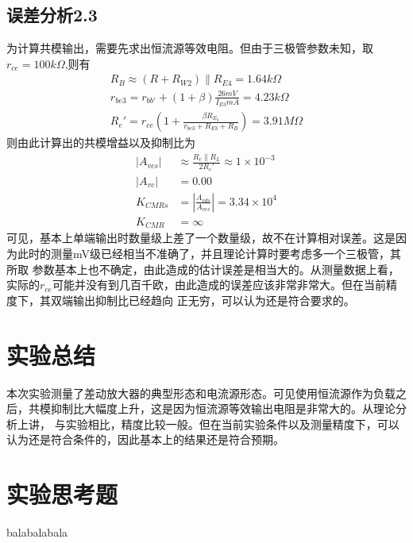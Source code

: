 \documentclass[a4paper,11pt,UTF8]{ctexart}
\begin{document}
\subsection{误差分析2.3}
为计算共模输出，需要先求出恒流源等效电阻。但由于三极管参数未知，取$r_{ce}=100k\Omega$,则有
\begin{equation}
  \begin{aligned}
    R_B\approx(R+R_{W2})\parallel R_{E4}=1.64k\Omega\\
    r_{be3}=r_{bb'}+(1+\beta)\frac{26mV}{I_{E3}mA}=4.23k\Omega\\
    R_e'=r_{ce}(1+\frac{\beta R_{E_3}}{r_{be3}+R_{E3}+R_{B}})=3.91M\Omega
  \end{aligned}
\end{equation}
则由此计算出的共模增益以及抑制比为
\begin{equation}
  \begin{aligned}
    \left | A_{vcs}\right |&\approx\frac{R_c\parallel R_L}{2R_e'}\approx1\times10^{-3}\\
    \left | A_{vc}\right |&=0.00\\
    K_{CMRs}&=\left |\frac{A_{vds}}{A_{vcs}}\right |=3.34\times10^{4}\\
    K_{CMR}&=\infty
  \end{aligned}
\end{equation}
可见，基本上单端输出时数量级上差了一个数量级，故不在计算相对误差。这是因为此时的测量mV级已经相当不准确了，并且理论计算时要考虑多一个三极管，其所取
参数基本上也不确定，由此造成的估计误差是相当大的。从测量数据上看，实际的$r_{ce}$可能并没有到几百千欧，由此造成的误差应该非常非常大。但在当前精度下，其双端输出抑制比已经趋向
正无穷，可以认为还是符合要求的。
\section{实验总结}
本次实验测量了差动放大器的典型形态和电流源形态。可见使用恒流源作为负载之后，共模抑制比大幅度上升，这是因为恒流源等效输出电阻是非常大的。从理论分析上讲，
与实验相比，精度比较一般。但在当前实验条件以及测量精度下，可以认为还是符合条件的，因此基本上的结果还是符合预期。
\section{实验思考题}
balabalabala
\end{document}
